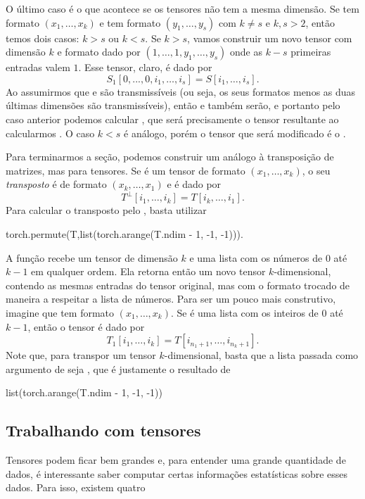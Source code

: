 \documentclass{article}
\begin{document}
O último caso é o que acontece se os tensores não tem a mesma dimensão. Se  tem formato $(x_1, \dots, x_k)$ e  tem formato $(y_1, \dots, y_s)$ com $k \neq s$ e $k, s > 2$, então temos dois casos: $k > s$ ou $k < s$. Se $k > s$, vamos construir um novo tensor  com dimensão $k$ e formato dado por $(1, \dots, 1, y_1, \dots, y_s)$ onde as $k-s$ primeiras entradas valem $1$. Esse tensor, claro, é dado por \begin{equation}
    S_1[0, ..., 0, i_1, \dots, i_s] = S[i_1, \dots, i_s].
\end{equation} Ao assumirmos que  e  são transmissíveis (ou seja, os seus formatos menos as duas últimas dimensões são transmissíveis), então  e  também serão, e portanto pelo caso anterior podemos calcular , que será precisamente o tensor resultante ao calcularmos . O caso $k < s$ é análogo, porém o tensor que será modificado é o .

Para terminarmos a seção, podemos construir um análogo à transposição de matrizes, mas para tensores. Se  é um tensor de formato $(x_1, \dots, x_k)$, o seu \textit{transposto} é de formato $(x_k, \dots, x_1)$ e é dado por \begin{equation}
    T^\perp[i_1, \dots, i_k] = T[i_k, \dots, i_1].
\end{equation} Para calcular o transposto pelo , basta utilizar \begin{python}
torch.permute(T,list(torch.arange(T.ndim - 1, -1, -1))).
\end{python} A função  recebe um tensor de dimensão $k$ e uma lista com os números de $0$ até $k-1$ em qualquer ordem. Ela retorna então um novo tensor $k$-dimensional, contendo as mesmas entradas do tensor original, mas com o formato trocado de maneira a respeitar a lista de números. Para ser um pouco mais construtivo, imagine que  tem formato $(x_1, \dots, x_k)$. Se  é uma lista com os inteiros de $0$ até $k-1$, então o tensor  é dado por \begin{equation}
    T_1[i_1, \dots, i_k] = T[i_{n_1 + 1}, \dots, i_{n_k + 1}].
\end{equation} Note que, para transpor um tensor $k$-dimensional, basta que a lista passada como argumento de  seja \pyth{[k-1, ..., 0]}, que é justamente o resultado de \begin{python}
list(torch.arange(T.ndim - 1, -1, -1))
\end{python}

\subsection{Trabalhando com tensores}

Tensores podem ficar bem grandes e, para entender uma grande quantidade de dados, é interessante saber computar certas informações estatísticas sobre esses dados. Para isso, existem quatro 

\nocite{*}
\printbibliography
\end{document}
